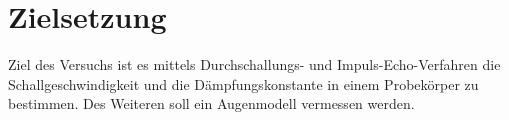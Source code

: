 
\section{Zielsetzung}
\label{sec:Zielsetzung}

Ziel des Versuchs ist es mittels Durchschallungs- und Impuls-Echo-Verfahren die Schallgeschwindigkeit und die Dämpfungskonstante in einem Probekörper zu bestimmen.
Des Weiteren soll ein Augenmodell vermessen werden.